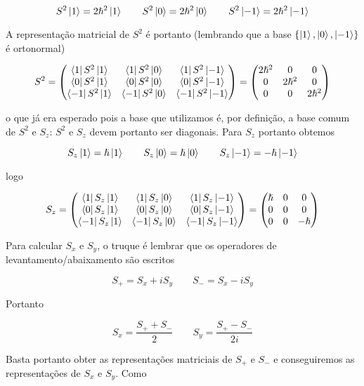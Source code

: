\documentclass[a4paper, 12pt, notitlepage]{article}
\begin{document}
\begin{enumerate}
\[
S^2 \ket{1} = 2 \hslash^2 \ket{1} \qquad S^2 \ket{0} = 2\hslash^2 \ket{0} \qquad S^2 \ket{-1} = 2\hslash^2 \ket{-1}
\]

A representação matricial de $S^2$ é portanto (lembrando que a base $\{\ket{1}, \ket{0}, \ket{-1}\}$ é ortonormal)

\[
S^2 = \begin{pmatrix} 
  \bra{1} S^2 \ket{1} & \bra{1} S^2 \ket{0} & \bra{1} S^2 \ket{-1} \\
  \bra{0} S^2 \ket{1} & \bra{0} S^2 \ket{0} & \bra{0} S^2 \ket{-1} \\
  \bra{-1} S^2 \ket{1} & \bra{-1} S^2 \ket{0} & \bra{-1} S^2 \ket{-1}
\end{pmatrix}
=
\begin{pmatrix}
  2 \hslash^2 & 0 & 0 \\
  0 & 2\hslash^2 & 0 \\
  0 & 0 & 2\hslash^2
\end{pmatrix}
\]

\noindent o que já era esperado pois a base que utilizamos é, por definição, a base comum de $S^2$ e $S_z$: $S^2$ e $S_z$ devem portanto ser diagonais. Para $S_z$ portanto obtemos

\[ 
S_z\ket{1} = \hslash \ket{1} \qquad S_z \ket{0} = \hslash \ket{0} \qquad S_z \ket{-1} = -\hslash \ket{-1} 
\]

\noindent logo

\[
S_z = \begin{pmatrix}
  \bra{1} S_z \ket{1} & \bra{1} S_z \ket{0} & \bra{1} S_z \ket{-1} \\
  \bra{0} S_z \ket{1} & \bra{0} S_z \ket{0} & \bra{0} S_z \ket{-1} \\
  \bra{-1} S_z \ket{1} & \bra{-1} S_z \ket{0} & \bra{-1} S_z \ket{-1}
\end{pmatrix}
= 
\begin{pmatrix}
  \hslash & 0 & 0 \\
  0 & 0 & 0 \\
  0 & 0 & -\hslash
\end{pmatrix}
\]

Para calcular $S_x$ e $S_y$, o truque é lembrar que os operadores de levantamento/abaixamento são escritos

\[ S_+ = S_x + iS_y \qquad S_- = S_x - iS_y \]

Portanto

\[ S_x = \frac{S_+ + S_-}{2} \qquad S_y = \frac{S_+ - S_-}{2i}\]

Basta portanto obter as representações matriciais de $S_+$ e $S_-$ e conseguiremos as representações de $S_x$ e $S_y$. Como


\end{enumerate}
\end{document}
